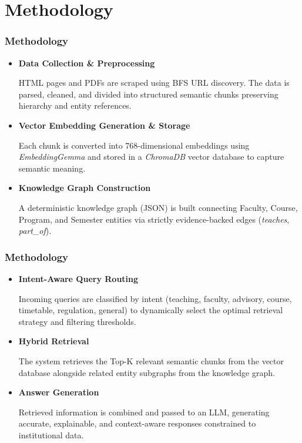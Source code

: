 \documentclass[10pt,aspectratio=1610]{beamer}
\begin{document}
\section{Methodology}
\begin{frame}
\frametitle{Methodology}

\begin{itemize}

\item \textbf{Data Collection \& Preprocessing}

HTML pages and PDFs are scraped using BFS URL discovery. The data is parsed, cleaned, and divided into structured semantic chunks preserving hierarchy and entity references.

\item \textbf{Vector Embedding Generation \& Storage}

Each chunk is converted into 768-dimensional embeddings using \textit{EmbeddingGemma} and stored in a \textit{ChromaDB} vector database to capture semantic meaning.

\item \textbf{Knowledge Graph Construction}

A deterministic knowledge graph (JSON) is built connecting Faculty, Course, Program, and Semester entities via strictly evidence-backed edges (\textit{teaches}, \textit{part\_of}).

\end{itemize}

\end{frame}

\begin{frame}
\frametitle{Methodology}

\begin{itemize}

\item \textbf{Intent-Aware Query Routing}

Incoming queries are classified by intent (teaching, faculty, advisory, course, timetable, regulation, general) to dynamically select the optimal retrieval strategy and filtering thresholds.

\item \textbf{Hybrid Retrieval}

The system retrieves the Top-K relevant semantic chunks from the vector database alongside related entity subgraphs from the knowledge graph.

\item \textbf{Answer Generation}

Retrieved information is combined and passed to an LLM, generating accurate, explainable, and context-aware responses constrained to institutional data.

\end{itemize}

\end{frame}
\end{document}
